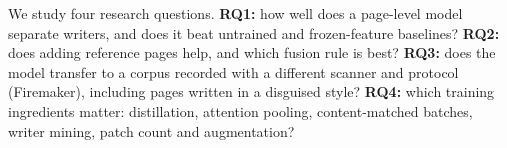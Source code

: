 We study four research questions.
\textbf{RQ1:} how well does a page-level model separate writers, and does it beat untrained and frozen-feature baselines?
\textbf{RQ2:} does adding reference pages help, and which fusion rule is best?
\textbf{RQ3:} does the model transfer to a corpus recorded with a different scanner and protocol (Firemaker), including pages written in a disguised style?
\textbf{RQ4:} which training ingredients matter: distillation, attention pooling, content-matched batches, writer mining, patch count and augmentation?
